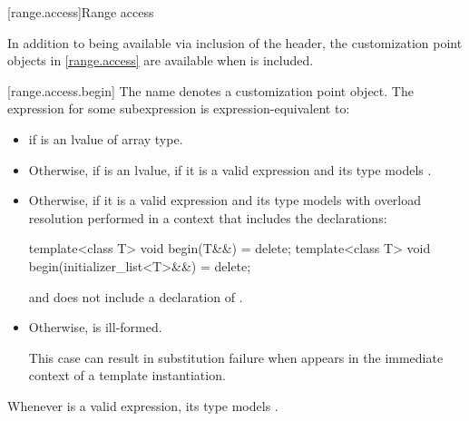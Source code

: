 [range.access]{Range access}

\pnum
In addition to being available via inclusion of the 
header, the customization point objects in \ref{range.access} are
available when  is included.

[range.access.begin]{}
\pnum
The name  denotes a customization point
object. The expression
 for some subexpression  is
expression-equivalent to:
\begin{itemize}
\item
   if  is an lvalue of array type.

\item
  Otherwise, if  is an lvalue,
  if it is a valid expression and its type  models
  .

\item
  Otherwise,  if it is a
  valid expression and its type  models
   with overload
  resolution performed in a context that includes the declarations:
  \begin{codeblock}
template<class T> void begin(T&&) = delete;
template<class T> void begin(initializer_list<T>&&) = delete;
  \end{codeblock}
  and does not include a declaration of .

\item
  Otherwise,  is ill-formed.
  \begin{note}
  This case can result in substitution failure when 
  appears in the immediate context of a template instantiation.
  \end{note}
\end{itemize}

\pnum
\begin{note}
Whenever  is a valid expression, its type models
.
\end{note}

